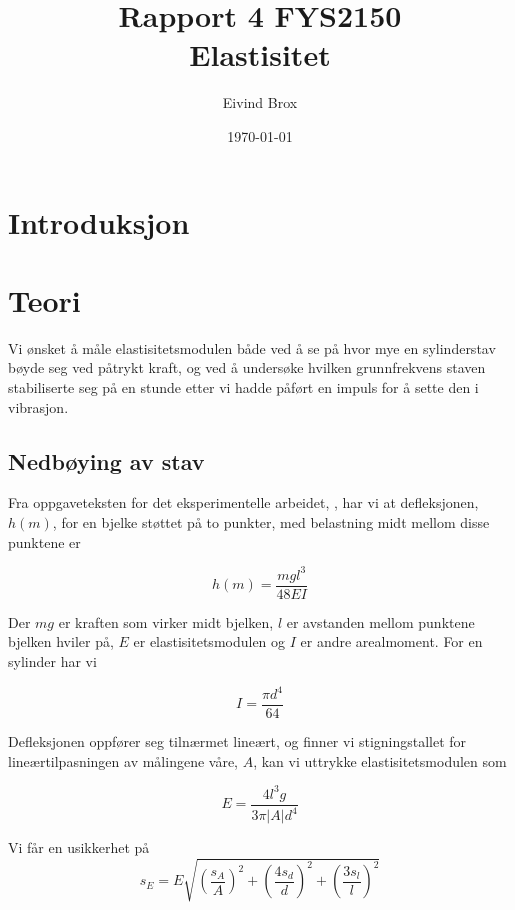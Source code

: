 \documentclass[a4paper,11pt, twocolumn]{article}
\title{Rapport 4 FYS2150\\Elastisitet}
\author{Eivind Brox}
\date{\today}
\begin{document}
\maketitle

\listoftodos

\begin{abstract}

\end{abstract}

\section{Introduksjon}
   
\section{Teori}
Vi ønsket å måle elastisitetsmodulen både ved å se på hvor mye en sylinderstav bøyde seg ved påtrykt kraft, og ved å undersøke hvilken grunnfrekvens staven stabiliserte seg på en stunde etter vi hadde påført en impuls for å sette den i vibrasjon.
\subsection{Nedbøying av stav}
Fra oppgaveteksten for det eksperimentelle arbeidet, \cite{oppgavetekst}, har vi at defleksjonen, $h(m)$, for en bjelke støttet på to punkter, med belastning midt mellom disse punktene er

\begin{equation}
	h(m) = \frac{mgl^3}{48EI}
\end{equation}

Der $mg$ er kraften som virker midt bjelken, $l$ er avstanden mellom punktene bjelken hviler på, $E$ er elastisitetsmodulen og $I$ er andre arealmoment. For en sylinder har vi

\begin{equation}
	I = \frac{\pi d^4}{64}
\end{equation}

Defleksjonen oppfører seg tilnærmet lineært, og finner vi stigningstallet for lineærtilpasningen av målingene våre, $A$, kan vi uttrykke elastisitetsmodulen som  

\begin{equation}
	E = \frac{4l^3g}{3\pi |A|d^4}
	\label{eq:elastisitetsmodulDefleksjon}
\end{equation}

Vi får en usikkerhet på
\begin{equation}
	s_E = E\sqrt{\left(\frac{s_A}{A}\right)^2+\left(\frac{4s_d}{d}\right)^2+\left(\frac{3s_l}{l}\right)^2}	
	\label{eq:feilDefleksjon}
\end{equation}
\end{document}

